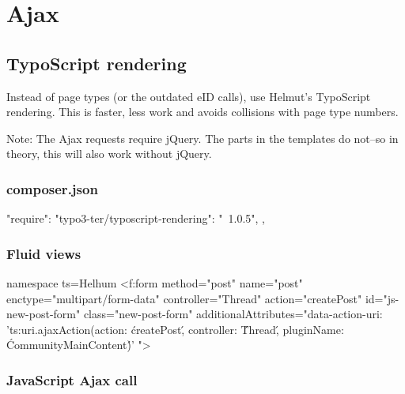 \chapter{Ajax}

\section{TypoScript rendering}
Instead of page types (or the outdated eID calls), use Helmut’s TypoScript rendering. This is faster, less work and avoids collisions with page type numbers.

Note: The Ajax requests require jQuery. The parts in the templates do not--so in theory, this will also work without jQuery.


\subsection{composer.json}

\begin{textcode}
"require": {
  "typo3-ter/typoscript-rendering": "~1.0.5",
},
\end{textcode}


\subsection{Fluid views}

\begin{htmlcode}
{namespace ts=Helhum\TyposcriptRendering\ViewHelpers}
<f:form method="post" name="post" enctype="multipart/form-data"
        controller="Thread" action="createPost"
        id="js-new-post-form" class="new-post-form"
        additionalAttributes="{data-action-uri:
          '{ts:uri.ajaxAction(action: \'createPost\',
            controller: \'Thread\',
            pluginName: \'CommunityMainContent\'
            )}'
          }">
\end{htmlcode}

\subsection{JavaScript Ajax call}


